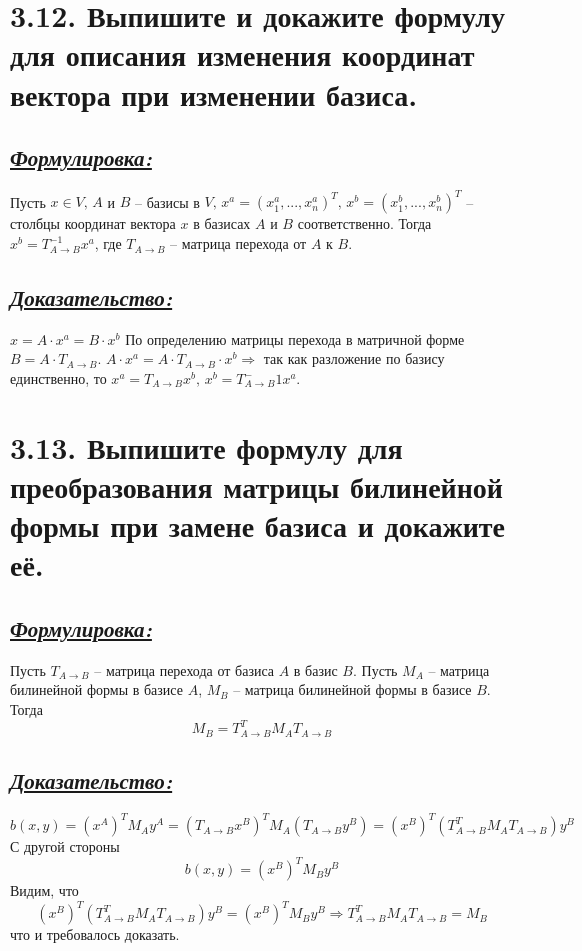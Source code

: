 \documentclass{article}
\begin{document}
\section*{\LARGE 3.12. Выпишите и докажите формулу для описания изменения координат вектора при изменении базиса. }
\subsection*{\Large \underline{\textit{Формулировка: }}}
Пусть $x \in V,\, A$ и $B$ -- базисы в $V, \, x^a = (x_1^a, ..., x_n^a)^T, \, x^b = (x_1^b, ..., x_n^b)^T$ -- столбцы координат вектора $x$ в базисах $A$ и $B$ соответственно. Тогда $x^b = T_{A \rightarrow B}^{-1} x^a$, где $T_{A \rightarrow B}$ -- матрица перехода от $A$ к $B$.

\subsection*{\Large \underline{\textit{Доказательство: }}}
$x = A \cdot x^a = B \cdot x^b$
\newline По определению матрицы перехода в матричной форме $B = A \cdot T_{A \rightarrow B}$.
\newline $A \cdot x^a = A \cdot T_{A \rightarrow B} \cdot x^b \Rightarrow$ так как разложение по базису единственно, то $x^a = T_{A \rightarrow B} x^b,\, x^b = T_{A \rightarrow B}^-1 x^a$.

\section*{\LARGE 3.13. Выпишите формулу для преобразования матрицы билинейной формы при замене базиса и докажите её. }
\subsection*{\Large \underline{\textit{Формулировка: }}}
Пусть $T_{A \rightarrow B}$ -- матрица перехода от базиса $A$ в базис $B$. Пусть $M_A$ -- матрица билинейной формы в базисе $A$, $M_B$ -- матрица билинейной формы в базисе $B$. Тогда 
$$
M_B = T_{A \rightarrow B}^T M_A T_{A \rightarrow B}
$$

\subsection*{\Large \underline{\textit{Доказательство: }}}
$$b(x, y) = (x^{A})^T M_A y^A = (T_{A \rightarrow B}x^{B})^T M_A (T_{A \rightarrow B} y^B) = 
(x^{B})^T (T_{A \rightarrow B}^T M_A T_{A \rightarrow B}) y^B$$
С другой стороны 
$$b(x, y) = (x^{B})^T M_B y^B$$
Видим, что 
$$
(x^{B})^T (T_{A \rightarrow B}^T M_A T_{A \rightarrow B}) y^B = (x^{B})^T M_B y^B \Rightarrow
T_{A \rightarrow B}^T M_A T_{A \rightarrow B} = M_B
$$
что и требовалось доказать.
\end{document}
